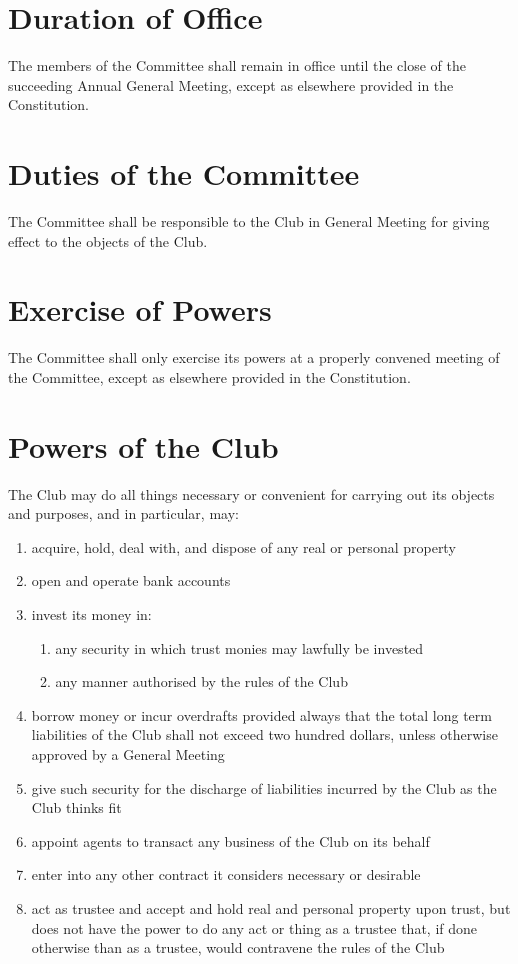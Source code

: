 \documentclass[11pt]{article} %
\begin{document}
\section{Duration of Office}
The members of the Committee shall remain in office until the close of the succeeding Annual General Meeting, except as elsewhere provided in the Constitution.

\section{Duties of the Committee}
The Committee shall be responsible to the Club in General Meeting for giving effect to the objects of the Club.

\section{Exercise of Powers}
The Committee shall only exercise its powers at a properly convened meeting of the Committee, except as elsewhere provided in the Constitution.

\section{Powers of the Club}
The Club may do all things necessary or convenient for carrying out its objects and purposes, and in particular, may:
\begin{enumerate}
	\item acquire, hold, deal with, and dispose of any real or personal property
	\item open and operate bank accounts
	\item invest its money in:
	\begin{enumerate}[1.]
			\item any security in which trust monies may lawfully be invested
			\item any manner authorised by the rules of the Club
		\end{enumerate}
	\item borrow money or incur overdrafts provided always that the total long term liabilities of the Club shall not exceed two hundred dollars, unless otherwise approved by a General Meeting
	\item give such security for the discharge of liabilities incurred by the Club as the Club thinks fit
	\item appoint agents to transact any business of the Club on its behalf
	\item enter into any other contract it considers necessary or desirable
	\item act as trustee and accept and hold real and personal property upon trust, but does not have the power to do any act or thing as a trustee that, if done otherwise than as a trustee, would contravene the rules of the Club
\end{enumerate}
\end{document}
